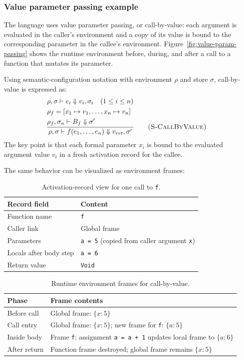 \subsubsection*{Value parameter passing example}
The language uses value parameter passing, or call-by-value: each argument is
evaluated in the caller's environment and a copy of its value is bound to the
corresponding parameter in the callee's environment. Figure~\ref{fig:value-param-passing}
shows the runtime environment before, during, and after a call to a function
that mutates its parameter.

Using semantic-configuration notation with environment $\rho$ and store $\sigma$,
call-by-value is expressed as:
\[
\frac{\begin{aligned}
  &\rho,\sigma \vdash e_i \Downarrow v_i,\sigma_i \quad (1 \le i \le n)\\
  &\rho_f = [x_1 \mapsto v_1,\ldots,x_n \mapsto v_n]\\
  &\rho_f,\sigma_n \vdash B_f \Downarrow \sigma'
\end{aligned}}
{\rho,\sigma \vdash f(e_1,\ldots,e_n) \Downarrow v_{ret},\sigma'}
\qquad \textsc{(S-CallByValue)}
\]
The key point is that each formal parameter $x_i$ is bound to the evaluated
argument value $v_i$ in a fresh activation record for the callee.

The same behavior can be visualized as environment frames:

\begin{table}[H]
\centering
\caption{Activation-record view for one call to \texttt{f}.\label{tab:activation-record-f}}
\small
\begin{tabular}{p{3.4cm}p{8.9cm}}
\toprule
Record field & Content \\
\midrule
Function name & \texttt{f} \\
Caller link & Global frame \\
Parameters & \texttt{a = 5} (copied from caller argument \texttt{x}) \\
Locals after body step & \texttt{a = 6} \\
Return value & \texttt{Void} \\
\bottomrule
\end{tabular}
\end{table}

\begin{table}[H]
\centering
\caption{Runtime environment frames for call-by-value.\label{tab:runtime-frames-cbv}}
\small
\begin{tabular}{p{3.4cm}p{8.9cm}}
\toprule
Phase & Frame contents \\
\midrule
Before call & Global frame: $\{x:5\}$ \\
Call entry & Global frame: $\{x:5\}$; new frame for \texttt{f}: $\{a:5\}$ \\
Inside body & Frame \texttt{f}: assignment \texttt{a = a + 1} updates local frame to $\{a:6\}$ \\
After return & Function frame destroyed; global frame remains $\{x:5\}$ \\
\bottomrule
\end{tabular}
\end{table}

